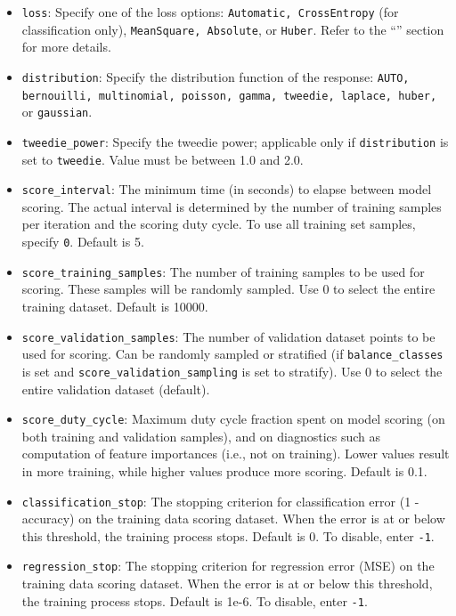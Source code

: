 \begin{itemize}
\item \texttt{loss}: Specify one of the loss options: \texttt{Automatic, CrossEntropy} (for classification only), \texttt{MeanSquare, Absolute}, or \texttt{Huber}. Refer to the ``'' section for more details.

\item \texttt{distribution}: Specify the distribution function of the response: \texttt{AUTO, bernouilli, multinomial, poisson, gamma, tweedie, laplace, huber,} or \texttt{gaussian}. 

\item \texttt{tweedie\_power}: Specify the tweedie power; applicable only if \texttt{distribution} is set to \texttt{tweedie}. Value must be between 1.0 and 2.0. 

\item \texttt{score\_interval}: The minimum time (in seconds) to elapse between model scoring. The actual interval is determined by the number of training samples per iteration and the scoring duty cycle. To use all training set samples, specify \texttt{0}. Default is 5.

\item \texttt{score\_training\_samples}: The number of training samples to be used for scoring.  These samples will be randomly sampled. Use 0 to select the entire training dataset.  Default is 10000.

\item \texttt{score\_validation\_samples}: The number of validation dataset points to be used for scoring. Can be randomly sampled or stratified (if  \texttt{balance\_classes} is set and \texttt{score\_validation\_sampling} is set to stratify). Use 0 to select the entire validation dataset (default).

\item \texttt{score\_duty\_cycle}: Maximum duty cycle fraction spent on model scoring (on both training and validation samples), and on diagnostics such as computation of feature importances (i.e., not on training). Lower values result in more training, while higher values produce more scoring. Default is 0.1.

\item \texttt{classification\_stop}: The stopping criterion for classification error (1 - accuracy) on the training data scoring dataset.  When the error is at or below this threshold, the training process stops.  Default is 0.  To disable, enter \texttt{-1}. 

\item \texttt{regression\_stop}: The stopping criterion for regression error (MSE) on the training data scoring dataset. When the error is at or below this threshold, the training process stops. Default is 1e-6.  To disable, enter \texttt{-1}. 


\end{itemize}
